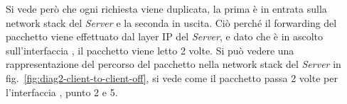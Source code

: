 Si vede però che ogni richiesta viene duplicata, la prima è in entrata sulla network stack del \textit{Server} e la seconda in uscita. Ciò perché il forwarding del pacchetto viene effettuato dal layer IP del \textit{Server}, e dato che  è in ascolto sull'interfaccia , il pacchetto viene letto 2 volte. Si può vedere una rappresentazione del percorso del pacchetto nella network stack del \textit{Server} in fig.~\ref{fig:diag2-client-to-client-off}, si vede come il pacchetto passa 2 volte per l'interfaccia , punto 2 e 5. 


